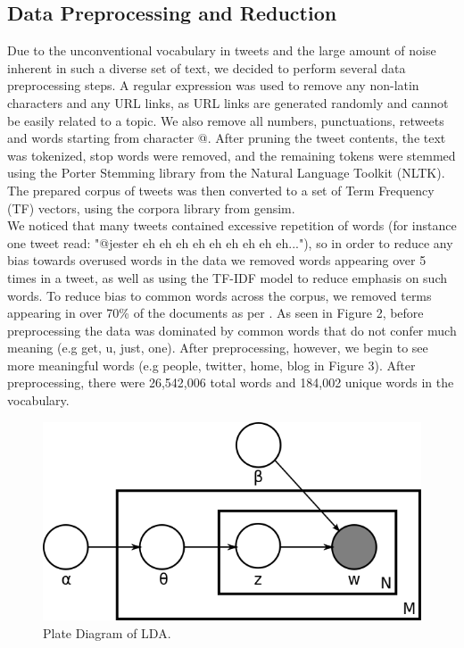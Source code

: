 \documentclass{acm_proc_article-sp}
\begin{document}
\subsection{Data Preprocessing and Reduction}
\hspace*{5mm}Due to the unconventional vocabulary in tweets and the large amount of noise inherent in such a diverse set of text, we decided to perform several data preprocessing steps. A regular expression was used to remove any non-latin characters and any URL links, as URL links are generated randomly and cannot be easily related to a topic. We also remove all numbers, punctuations, retweets and words starting from character @. After pruning the tweet contents, the text was tokenized, stop words were removed, and the remaining tokens were stemmed using the Porter Stemming library from the Natural Language Toolkit (NLTK). The prepared corpus of tweets was then converted to a set of Term Frequency (TF) vectors, using the corpora library from gensim. \\
We noticed that many tweets contained excessive repetition of words (for instance one tweet read: "@jester eh eh eh eh eh eh eh eh eh..."), so in order to reduce any bias towards overused words in the data we removed words appearing over 5 times in a tweet, as well as using the TF-IDF model to reduce emphasis on such words. To reduce bias to common words across the corpus, we removed terms appearing in over 70\% of the documents as per \cite{zhao2011comparing}. As seen in Figure 2, before preprocessing the data was dominated by common words that do not confer much meaning (e.g get, u, just, one). After preprocessing, however, we begin to see more meaningful words (e.g people, twitter, home, blog in Figure 3). After preprocessing, there were 26,542,006 total words and 184,002 unique words in the vocabulary.\\


\begin{figure}[ht]
\includegraphics[scale=0.4]{figs/LDA}
\caption{Plate Diagram of LDA.}
\label{fig:platelda}
\end{figure}
\end{document}
